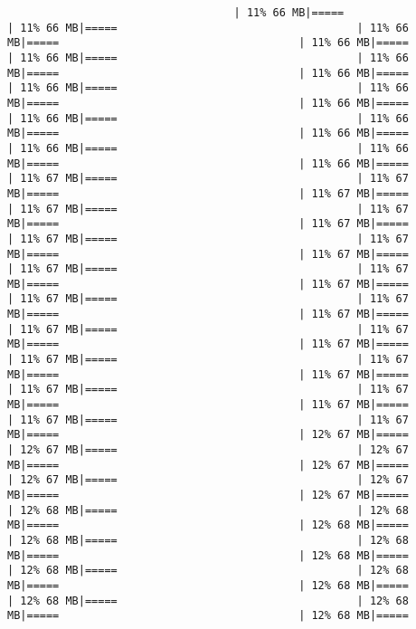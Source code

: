 \documentclass[
]{article}
\begin{document}
\begin{verbatim}
                                   | 11% 66 MB|=====                                     | 11% 66 MB|=====                                     | 11% 66 MB|=====                                     | 11% 66 MB|=====                                     | 11% 66 MB|=====                                     | 11% 66 MB|=====                                     | 11% 66 MB|=====                                     | 11% 66 MB|=====                                     | 11% 66 MB|=====                                     | 11% 66 MB|=====                                     | 11% 66 MB|=====                                     | 11% 66 MB|=====                                     | 11% 66 MB|=====                                     | 11% 66 MB|=====                                     | 11% 66 MB|=====                                     | 11% 66 MB|=====                                     | 11% 67 MB|=====                                     | 11% 67 MB|=====                                     | 11% 67 MB|=====                                     | 11% 67 MB|=====                                     | 11% 67 MB|=====                                     | 11% 67 MB|=====                                     | 11% 67 MB|=====                                     | 11% 67 MB|=====                                     | 11% 67 MB|=====                                     | 11% 67 MB|=====                                     | 11% 67 MB|=====                                     | 11% 67 MB|=====                                     | 11% 67 MB|=====                                     | 11% 67 MB|=====                                     | 11% 67 MB|=====                                     | 11% 67 MB|=====                                     | 11% 67 MB|=====                                     | 11% 67 MB|=====                                     | 11% 67 MB|=====                                     | 11% 67 MB|=====                                     | 11% 67 MB|=====                                     | 11% 67 MB|=====                                     | 11% 67 MB|=====                                     | 11% 67 MB|=====                                     | 11% 67 MB|=====                                     | 11% 67 MB|=====                                     | 12% 67 MB|=====                                     | 12% 67 MB|=====                                     | 12% 67 MB|=====                                     | 12% 67 MB|=====                                     | 12% 67 MB|=====                                     | 12% 67 MB|=====                                     | 12% 67 MB|=====                                     | 12% 68 MB|=====                                     | 12% 68 MB|=====                                     | 12% 68 MB|=====                                     | 12% 68 MB|=====                                     | 12% 68 MB|=====                                     | 12% 68 MB|=====                                     | 12% 68 MB|=====                                     | 12% 68 MB|=====                                     | 12% 68 MB|=====                                     | 12% 68 MB|=====                                     | 12% 68 MB|=====                                     | 12% 68 MB|=====                           
\end{verbatim}
\end{document}
